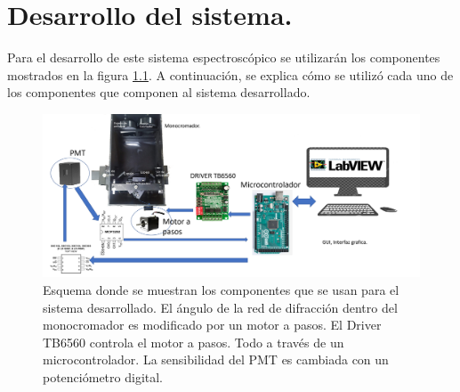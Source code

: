 \chapter{Desarrollo del sistema.}
Para el desarrollo de este sistema espectroscópico se utilizarán los componentes mostrados en la figura \ref{fig:esquema}. A continuación, se explica cómo se utilizó cada uno de los componentes que componen al sistema desarrollado.

\begin{figure}[h]
	\centering
	\includegraphics[width=0.98\linewidth]{Imagenes/3/esquema}
	\caption[Esquema donde se muestran los componentes que se usarán para el sistema desarrollado.]{Esquema donde se muestran los componentes que se usan para el sistema desarrollado. El ángulo de la red de difracción dentro del monocromador es modificado por un motor a pasos. El Driver TB6560 controla el motor a pasos. Todo a través de un microcontrolador. La sensibilidad del PMT es cambiada con un potenciómetro digital.}
	\label{fig:esquema}
\end{figure}


